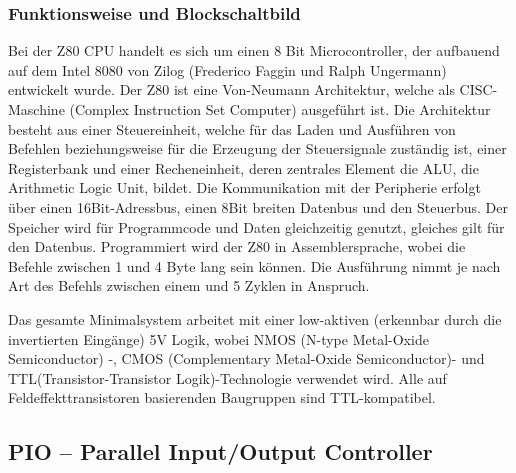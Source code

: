 \subsubsection{Funktionsweise und Blockschaltbild}
Bei der Z80 CPU handelt es sich um einen 8 Bit Microcontroller, der aufbauend auf dem Intel 8080 von Zilog (Frederico Faggin und Ralph Ungermann) entwickelt wurde. Der Z80 ist eine Von-Neumann Architektur, welche als CISC-Maschine (Complex Instruction Set Computer) ausgeführt ist. Die Architektur besteht aus einer Steuereinheit, welche für das Laden und Ausführen von Befehlen beziehungsweise für die Erzeugung der Steuersignale zuständig ist, einer Registerbank und einer Recheneinheit, deren zentrales Element die ALU, die Arithmetic Logic Unit, bildet. Die Kommunikation mit der Peripherie erfolgt über einen 16Bit-Adressbus, einen 8Bit breiten Datenbus und den Steuerbus. Der Speicher wird für Programmcode und Daten gleichzeitig genutzt, gleiches gilt für den Datenbus. Programmiert wird der Z80 in Assemblersprache, wobei die Befehle zwischen 1 und 4 Byte lang sein können. Die Ausführung nimmt je nach Art des Befehls zwischen einem und 5 Zyklen in Anspruch.

Das gesamte Minimalsystem arbeitet mit einer low-aktiven (erkennbar durch die invertierten Eingänge) 5V Logik, wobei NMOS (N-type Metal-Oxide Semiconductor) -, CMOS (Complementary Metal-Oxide Semiconductor)- und TTL(Transistor-Transistor Logik)-Technologie verwendet wird. Alle auf Feldeffekttransistoren basierenden Baugruppen sind TTL-kompatibel.

\subsection{PIO -- Parallel Input/Output Controller}
